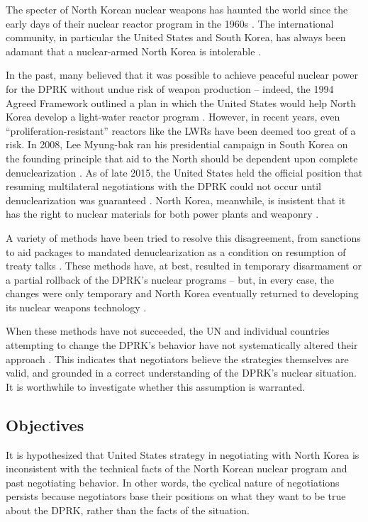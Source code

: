 \documentclass{article}
\begin{document}
The specter of North Korean nuclear weapons has haunted the world since the early days of their nuclear reactor program in the 1960s \cite{pincus}. The international community, in particular the United States and South Korea, has always been adamant that a nuclear-armed North Korea is intolerable \cite{kerry,parksk}.

In the past, many believed that it was possible to achieve peaceful nuclear power for the DPRK without undue risk of weapon production – indeed, the 1994 Agreed Framework outlined a plan in which the United States would help North Korea develop a light-water reactor program \cite{agreed}. However, in recent years, even “proliferation-resistant” reactors like the LWRs have been deemed too great of a risk. In 2008, Lee Myung-bak ran his presidential campaign in South Korea on the founding principle that aid to the North should be dependent upon complete denuclearization \cite{snyder}. As of late 2015, the United States held the official position that resuming multilateral negotiations with the DPRK could not occur until denuclearization was guaranteed \cite{pennington}. North Korea, meanwhile, is insistent that it has the right to nuclear materials for both power plants and weaponry \cite{kcna}. 

A variety of methods have been tried to resolve this disagreement, from sanctions to aid packages to mandated denuclearization as a condition on resumption of treaty talks \cite{bajoria,davenport}. These methods have, at best, resulted in temporary disarmament or a partial rollback of the DPRK’s nuclear programs – but, in every case, the changes were only temporary and North Korea eventually returned to developing its nuclear weapons technology \cite{davenport,nti15,iaea09}.

When these methods have not succeeded, the UN and individual countries attempting to change the DPRK’s behavior have not systematically altered their approach \cite{davenport,nti15}. This indicates that negotiators believe the strategies themselves are valid, and grounded in a correct understanding of the DPRK’s nuclear situation. It is worthwhile to investigate whether this assumption is warranted.

\subsection{Objectives}

It is hypothesized that United States strategy in negotiating with North Korea is inconsistent with the technical facts of the North Korean nuclear program and past negotiating behavior. In other words, the cyclical nature of negotiations persists because negotiators base their positions on what they want to be true about the DPRK, rather than the facts of the situation. 
\end{document}
